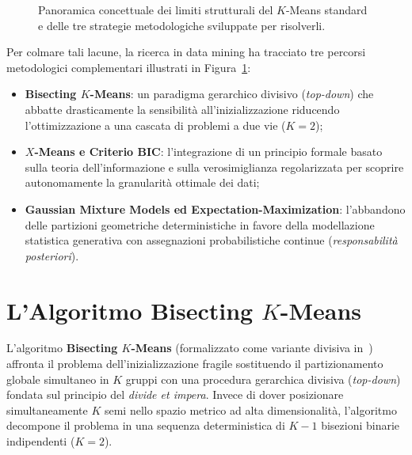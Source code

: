 \begin{figure}[htbp]
\caption{Panoramica concettuale dei limiti strutturali del $K$-Means standard e delle tre strategie metodologiche sviluppate per risolverli.}
\label{fig:dm-kmeans-limits-overview}
\end{figure}

Per colmare tali lacune, la ricerca in data mining ha tracciato tre percorsi metodologici complementari illustrati in Figura~\ref{fig:dm-kmeans-limits-overview}:
\begin{itemize}
    \item \textbf{Bisecting $K$-Means}: un paradigma gerarchico divisivo (\textit{top-down}) che abbatte drasticamente la sensibilità all'inizializzazione riducendo l'ottimizzazione a una cascata di problemi a due vie ($K=2$);
    \item \textbf{$X$-Means e Criterio BIC}: l'integrazione di un principio formale basato sulla teoria dell'informazione e sulla verosimiglianza regolarizzata per scoprire autonomamente la granularità ottimale dei dati;
    \item \textbf{Gaussian Mixture Models ed Expectation-Maximization}: l'abbandono delle partizioni geometriche deterministiche in favore della modellazione statistica generativa con assegnazioni probabilistiche continue (\textit{responsabilità posteriori}).
\end{itemize}

\section{L'Algoritmo Bisecting \texorpdfstring{$K$}{K}-Means}
\label{sec:dm-bisecting-kmeans}

L'algoritmo \textbf{Bisecting $K$-Means} (formalizzato come variante divisiva in~\cite{tan2018}) affronta il problema dell'inizializzazione fragile sostituendo il partizionamento globale simultaneo in $K$ gruppi con una procedura gerarchica divisiva (\textit{top-down}) fondata sul principio del \textit{divide et impera}. Invece di dover posizionare simultaneamente $K$ semi nello spazio metrico ad alta dimensionalità, l'algoritmo decompone il problema in una sequenza deterministica di $K-1$ bisezioni binarie indipendenti ($K=2$).

